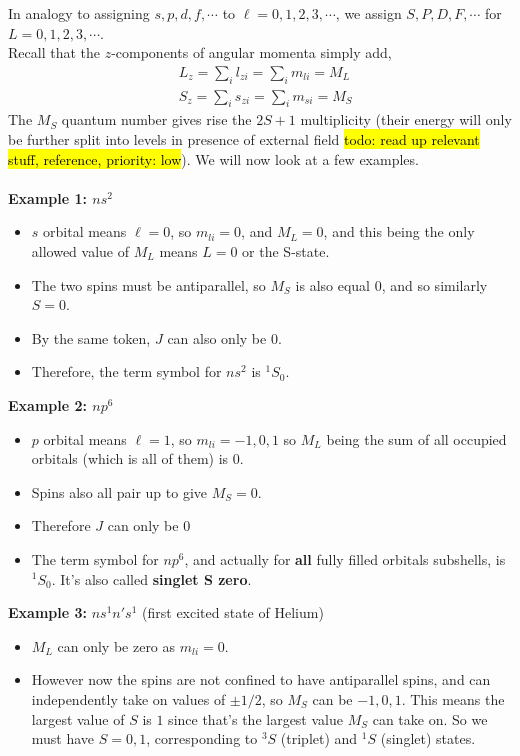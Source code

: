 In analogy to assigning $s,p,d,f,\cdots$ to $\ell=0,1,2,3,\cdots$, we assign
$S,P,D,F,\cdots$ for $L=0,1,2,3,\cdots$. \\
Recall that the $z$-components of angular momenta simply add, \ie
\begin{equation}
\begin{aligned}
&L_z=\sum_i l_{zi}=\sum_i m_{li}=M_L\\
&S_z=\sum_i s_{zi}=\sum_i m_{si}=M_S
\end{aligned}
\end{equation}
The $M_S$ quantum number gives rise the $2S+1$ multiplicity (their energy will only be further split into levels in presence of external field \hl{todo: read up relevant stuff, reference, priority: low}). We will now look at a few examples. \\
\ \\
\textbf{Example 1: $ns^2$}
\begin{itemize}
	\item $s$ orbital means $\ell=0$, so $m_{li}=0$, and $M_L=0$, and this being the only allowed value of $M_L$ means $L=0$ or the S-state.
	\item The two spins must be antiparallel, so $M_S$ is also equal $0$, and so similarly $S=0$.
	\item By the same token, $J$ can also only be $0$.
	\item Therefore, the term symbol for $ns^2$ is $^1S_0$.
\end{itemize}
\textbf{Example 2: $np^6$}
\begin{itemize}
	\item $p$ orbital means $\ell=1$, so $m_{li}=-1,0,1$ so $M_L$ being the sum of all occupied orbitals (which is all of them) is $0$.
	\item Spins also all pair up to give $M_S=0$.
	\item Therefore $J$ can only be $0$
	\item The term symbol for $np^6$, and actually for \textbf{all} fully filled orbitals subshells, is $^1S_0$. It's also called \textbf{singlet S zero}.
\end{itemize}
\textbf{Example 3: }$ns^1n's^1$ (first excited state of Helium)
\begin{itemize}
	\item $M_L$ can only be zero as $m_{li}=0$.
	\item However now the spins are not confined to have antiparallel spins, and can independently take on values of $\pm1/2$, so $M_S$ can be $-1,0,1$. This means the largest value of $S$ is $1$ since that's the largest value $M_S$ can take on. So we must have $S=0,1$, corresponding to $^3S$ (triplet) and $^1S$ (singlet) states.
\end{itemize}
